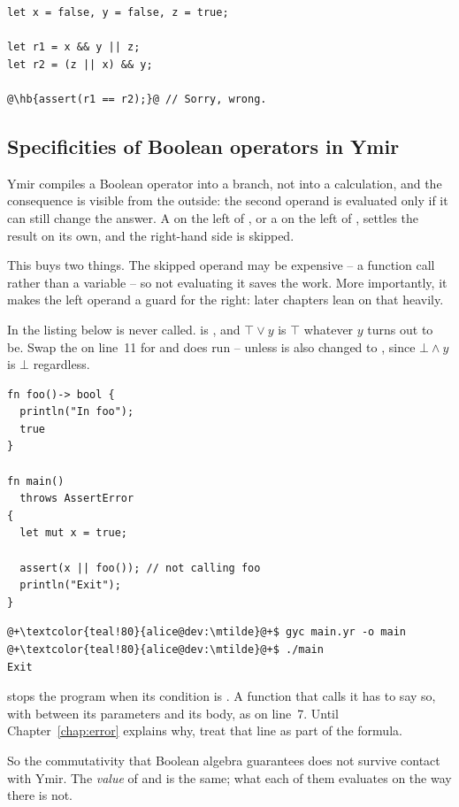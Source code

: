 \begin{lstlisting}[style=coloredverbatim, label=lst:types:boolean_error, caption=Example of logic error when dealing with Boolean values, escapechar=@]
let x = false, y = false, z = true;

let r1 = x && y || z;
let r2 = (z || x) && y;

@\hb{assert(r1 == r2);}@ // Sorry, wrong. 
\end{lstlisting}

\subsection{Specificities of Boolean operators in Ymir}

Ymir compiles a Boolean operator into a branch, not into a calculation, and the
consequence is visible from the outside: the second operand is evaluated only if
it can still change the answer. A  on the left of \token{&&}, or a
 on the left of \token{||}, settles the result on its own, and the
right-hand side is skipped.

This buys two things. The skipped operand may be expensive -- a function call
rather than a variable -- so not evaluating it saves the work. More importantly,
it makes the left operand a guard for the right: later chapters lean on that
heavily.

In the listing below  is never called.  is , and
$\top \lor y$ is $\top$ whatever $y$ turns out to be. Swap the \token{||} on
line~11 for \token{&&} and  does run -- unless  is also
changed to , since $\bot \land y$ is $\bot$ regardless.

\begin{lstlisting}[style=coloredverbatim, caption=Example of boolean operation optimised out]
fn foo()-> bool {
  println("In foo");
  true
}

fn main()
  throws AssertError
{
  let mut x = true;

  assert(x || foo()); // not calling foo
  println("Exit");
}
\end{lstlisting}
\begin{lstlisting}[style=bashVerb, escapechar=@+]
@+\textcolor{teal!80}{alice@dev:\mtilde}@+$ gyc main.yr -o main
@+\textcolor{teal!80}{alice@dev:\mtilde}@+$ ./main
Exit
\end{lstlisting}

 stops the program when its condition is . A
function that calls it has to say so, with  between
its parameters and its body, as on line~7. Until
Chapter~\ref{chap:error} explains why, treat that line as part of the formula.

So the commutativity that Boolean algebra guarantees does not survive contact
with Ymir. The \emph{value} of  and  is the same; what
each of them evaluates on the way there is not.
